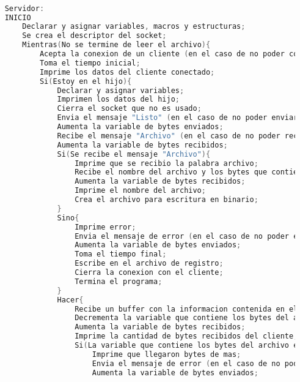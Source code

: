 \begin{lstlisting}[language=C]          % No usar tildes en el pseudocódigo y dejar una linea vacía al principio y al final

    Servidor:
    INICIO
        Declarar y asignar variables, macros y estructuras;
        Se crea el descriptor del socket;
        Mientras(No se termine de leer el archivo){
            Acepta la conexion de un cliente (en el caso de no poder conectarlo imprime error);
            Toma el tiempo inicial;
            Imprime los datos del cliente conectado;
            Si(Estoy en el hijo){
                Declarar y asignar variables;
                Imprimen los datos del hijo;
                Cierra el socket que no es usado;
                Envia el mensaje "Listo" (en el caso de no poder enviarlo imprime error);
                Aumenta la variable de bytes enviados;                
                Recibe el mensaje "Archivo" (en el caso de no poder recibirlo imprime error);
                Aumenta la variable de bytes recibidos;
                Si(Se recibe el mensaje "Archivo"){
                    Imprime que se recibio la palabra archivo;
                    Recibe el nombre del archivo y los bytes que contiene (en el caso de no poder recibirlo imprime error);
                    Aumenta la variable de bytes recibidos;
                    Imprime el nombre del archivo;
                    Crea el archivo para escritura en binario;
                }
                Sino{
                    Imprime error;
                    Envia el mensaje de error (en el caso de no poder enviarlo imprime error);
                    Aumenta la variable de bytes enviados;
                    Toma el tiempo final;
                    Escribe en el archivo de registro;
                    Cierra la conexion con el cliente;
                    Termina el programa;
                }
                Hacer{
                    Recibe un buffer con la informacion contenida en el archivo y lo escribe en el nuevo archivo (en el caso de no poder recibirlo imprime error);
                    Decrementa la variable que contiene los bytes del archivo;
                    Aumenta la variable de bytes recibidos;
                    Imprime la cantidad de bytes recibidos del cliente;
                    Si(La variable que contiene los bytes del archivo es menor a 0){
                        Imprime que llegaron bytes de mas;
                        Envia el mensaje de error (en el caso de no poder enviarlo imprime error);
                        Aumenta la variable de bytes enviados;

\end{lstlisting}
